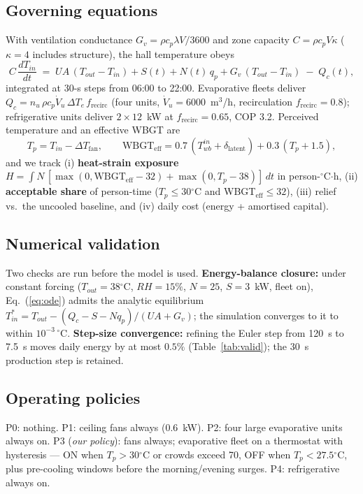 \documentclass[11pt]{article}
\newcommand{\degrees}{\ensuremath{^\circ}}
\begin{document}
\subsection{Governing equations}
With ventilation conductance $G_v=\rho c_p \lambda V/3600$ and zone capacity $C=\rho c_p V\kappa$ ($\kappa=4$ includes structure), the hall temperature obeys
\begin{equation}
C\,\frac{dT_{in}}{dt} \;=\; UA\,(T_{out}-T_{in}) + S(t) + N(t)\,q_p + G_v\,(T_{out}-T_{in}) \;-\; Q_c(t),
\label{eq:ode}
\end{equation}
integrated at 30-s steps from 06:00 to 22:00. Evaporative fleets deliver
$Q_c = n_u\,\rho c_p \dot V_u\,\Delta T_e\,f_{\text{recirc}}$ (four units, $\dot V_u=6000$~m$^3$/h, recirculation $f_{\text{recirc}}=0.8$); refrigerative units deliver $2\times12$~kW at $f_{\text{recirc}}=0.65$, COP 3.2. Perceived temperature and an effective WBGT \cite{acgih} are
\begin{equation}
T_p = T_{in} - \Delta T_{\text{fan}},\qquad
\text{WBGT}_{\text{eff}} = 0.7\,(T_{wb}^{in}+\delta_{\text{latent}}) + 0.3\,(T_p+1.5),
\end{equation}
and we track (i) \textbf{heat-strain exposure} $H=\int N\,[\max(0,\text{WBGT}_{\text{eff}}-32)+\max(0,T_p-38)]\,dt$ in person-$\degrees$C$\cdot$h, (ii) \textbf{acceptable share} of person-time ($T_p\leq30\degrees$C and WBGT$_{\text{eff}}\leq32$), (iii) relief vs.\ the uncooled baseline, and (iv) daily cost (energy + amortised capital).

\subsection{Numerical validation}
Two checks are run before the model is used. \textbf{Energy-balance closure:} under constant forcing ($T_{out}=38\degrees$C, $RH=15\%$, $N=25$, $S=3$~kW, fleet on), Eq.~(\ref{eq:ode}) admits the analytic equilibrium $T_{in}^{*}=T_{out}-(Q_c-S-Nq_p)/(UA+G_v)$; the simulation converges to it to within $10^{-3}\,\degrees$C. \textbf{Step-size convergence:} refining the Euler step from 120~s to 7.5~s moves daily energy by at most $0.5\%$ (Table~\ref{tab:valid}); the 30~s production step is retained.

\subsection{Operating policies}
P0: nothing. P1: ceiling fans always (0.6~kW). P2: four large evaporative units always on. P3 (\textit{our policy}): fans always; evaporative fleet on a thermostat with hysteresis --- ON when $T_p>30\degrees$C or crowds exceed 70, OFF when $T_p<27.5\degrees$C, plus pre-cooling windows before the morning/evening surges. P4: refrigerative always on.
\end{document}
